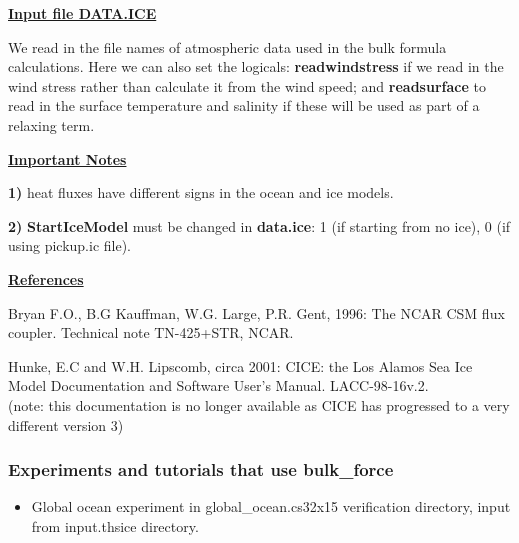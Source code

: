 \noindent
{\bf {\underline{Input file DATA.ICE}}}

\noindent
We read in the file names of atmospheric data used in
the  bulk formula calculations. Here we can also set
the logicals: {\bf readwindstress} if we read in the
wind stress rather than calculate it from the wind
speed; and {\bf readsurface} to read in the surface
temperature and salinity if these will be used as
part of a relaxing term.

\vspace{1cm}

\noindent
{\bf {\underline{Important Notes}}}

\noindent
{\bf 1)} heat fluxes have different signs in the ocean and ice
models.

\noindent
{\bf 2)} {\bf StartIceModel} must be changed in {\bf data.ice}:
1 (if starting from no ice), 0 (if using pickup.ic file).


\vspace{1cm}

\noindent 
{\bf {\underline{References}}}


\vspace{.2cm}

\noindent
Bryan F.O., B.G Kauffman, W.G. Large, P.R. Gent, 1996:
The NCAR CSM flux coupler. Technical note TN-425+STR,
NCAR.

\vspace{.2cm}

\noindent
Hunke, E.C and W.H. Lipscomb, circa 2001: CICE: the Los Alamos
Sea Ice Model Documentation and Software User's Manual.
LACC-98-16v.2.\\
(note: this documentation is no longer available as CICE has progressed
to a very different version 3)





% 

\subsubsection{Experiments and tutorials that use bulk\_force}
\label{sec:pkg:bulk_force:experiments}

\begin{itemize}
\item{Global ocean experiment in global\_ocean.cs32x15 verification directory, input from input.thsice directory.}
\end{itemize}

